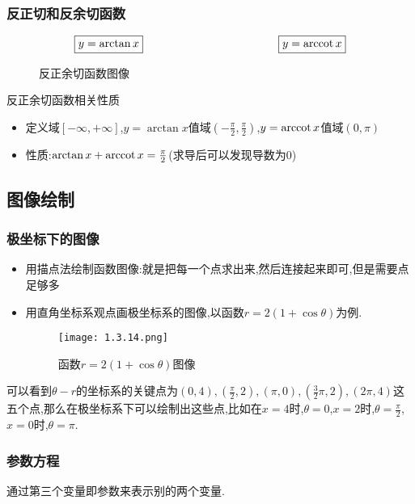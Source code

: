 \documentclass[12pt, a4paper, oneside, UTF8]{ctexbook}  %
\begin{document}
\subsubsection{反正切和反余切函数}
$$
    \boxed{y=\arctan x}
    \qquad \qquad \qquad \qquad \qquad \qquad
    \boxed{y=\mathrm{arccot}\, x}
$$
\begin{figure}[H] \centering
    \caption{反正余切函数图像}
\end{figure}
\begin{criterion}{反正余切函数相关性质}{}
    \begin{itemize}
        \item 定义域$[-\infty,+\infty]$,$y=\arctan x$值域$(-\frac{\pi}{2},\frac{\pi}{2})$,$y=\mathrm{arccot}\, x$值域$(0,\pi)$
        \item 性质:$\arctan x+\mathrm{arccot}\, x=\frac{\pi}{2}$(求导后可以发现导数为0)
    \end{itemize}
\end{criterion}

\subsection{图像绘制}

\subsubsection{极坐标下的图像}

\begin{itemize}
    \item 用描点法绘制函数图像:就是把每一个点求出来,然后连接起来即可,但是需要点足够多
    \item 用直角坐标系观点画极坐标系的图像,以函数$r=2(1+\cos \theta )$为例.
          \begin{figure}[H]
              \centering \texttt{[image: 1.3.14.png]} \caption{函数$r=2(1+\cos \theta)$图像}
          \end{figure}
\end{itemize}
可以看到$\theta - r $的坐标系的关键点为$(0,4),(\frac{\pi}{2},2),(\pi,0),(\frac{3}{2}\pi,2),(2\pi,4)$这五个点,那么在极坐标系下可以绘制出这些点,比如在$x=4$时,$\theta = 0$,$x=2$时,$\theta = \frac{\pi}{2}$,$x=0$时,$\theta = \pi$.
\subsubsection{参数方程}
通过第三个变量即参数来表示别的两个变量.
\end{document}
